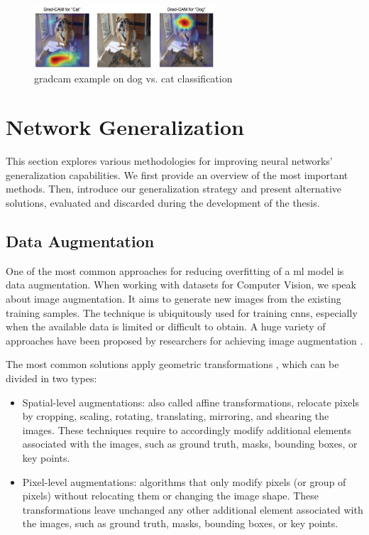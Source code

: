 \begin{figure}[H]
    \centering
    \includegraphics[width=0.6\textwidth]{"contents/images/gradcam/02-gradcam-catdog"}
    \caption[\gls{gradcam} example on dog vs. cat classification]{\gls{gradcam} example on dog vs. cat classification \cite{Selvaraju_2019}}
    \label{fig:gradcam-catdog}
\end{figure}




\section{Network Generalization}
\label{sec:network-generalization}

This section explores various methodologies for improving neural networks' generalization capabilities. We first provide an overview of the most important methods. Then, introduce our generalization strategy and present alternative solutions, evaluated and discarded during the development of the thesis.



\subsection{Data Augmentation}
\label{subsec:data-augmentation}

One of the most common approaches for reducing overfitting of a \gls{ml} model is data augmentation. When working with datasets for Computer Vision, we speak about image augmentation. It aims to generate new images from the existing training samples. The technique is ubiquitously used for training \gls{cnn}s, especially when the available data is limited or difficult to obtain. A huge variety of approaches have been proposed by researchers for achieving image augmentation \cite{shorten2019augmentationsurvey}.

The most common solutions apply geometric transformations \cite{xie2020unsupervised}, which can be divided in two types:
\begin{itemize}
	\item Spatial-level augmentations: also called affine transformations, relocate pixels by cropping, scaling, rotating, translating, mirroring, and shearing the images. These techniques require to accordingly modify additional elements associated with the images, such as ground truth, masks, bounding boxes, or key points.
	\item Pixel-level augmentations: algorithms that only modify pixels (or group of pixels) without relocating them or changing the image shape. These transformations leave unchanged any other additional element associated with the images, such as ground truth, masks, bounding boxes, or key points.
\end{itemize}

